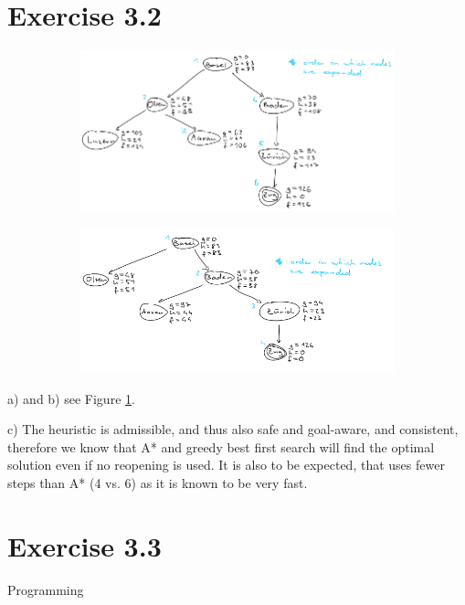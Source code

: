 \documentclass[12pt]{article}
\begin{document}
\section*{Exercise 3.2}

\begin{figure}[h!]
    \begin{subfigure}[t]{\textwidth}
        \centering
        \includegraphics[width=\textwidth]{figures/3.2a.png}
        \caption{}
    \end{subfigure}
    \begin{subfigure}[t]{\textwidth}
        \centering
        \includegraphics[width=\textwidth]{figures/3.2b.png}
        \caption{}
    \end{subfigure}
    \caption{}
    \label{3.2}
\end{figure}

a) and b) see Figure \ref{3.2}.

c) The heuristic is admissible, and thus also safe and goal-aware, and consistent, therefore we know that A* and greedy best first search will find the optimal solution even if no reopening is used. It is also to be expected, that uses fewer steps than A* (4 vs. 6) as it is known to be very fast.


\section*{Exercise 3.3}

Programming
\end{document}
